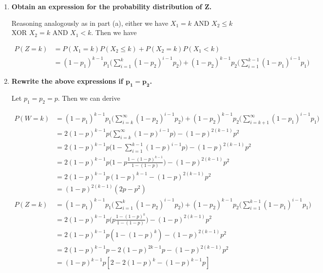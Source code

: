 \documentclass[10pt, oneside]{article}
\begin{document}
\begin{enumerate}[label=8.\arabic*]
\begin{enumerate}
	\item  \begin{tcolorbox}[
	  colback=Cerulean!5!white,
	  colframe=Cerulean!75!black]
	\textbf{Obtain an expression for the probability distribution of $\bm{Z}$.}
	\end{tcolorbox}
	
	Reasoning analogously as in part (a), either we have $X_1 = k$ AND $X_2 \leq k$ XOR $X_2 = k$ AND $X_1 < k$. Then we have
	
	\begin{align*}
	P(Z = k) &= P(X_1 = k) P(X_2 \leq k) + P(X_2 = k) P(X_1 < k) \\
	&= \boxed{ (1-p_1)^{k-1} p_1 \Bigg( \sum^k_{i = 1} (1-p_2)^{i-1} p_2 \Bigg) + (1-p_2)^{k-1} p_2 \Bigg( \sum^{k-1}_{i=1} (1-p_1)^{i-1} p_1 \Bigg)}
	\end{align*}
	
	\item  \begin{tcolorbox}[
	  colback=Cerulean!5!white,
	  colframe=Cerulean!75!black]
	\textbf{Rewrite the above expressions if $\bm{p_1 = p_2}$.}
	\end{tcolorbox}
	
	Let $p_1 = p_2 = p$. Then we can derive
	
	\begin{align*}
	P(W = k) &= (1-p_1)^{k-1} p_1 \Bigg( \sum^{\infty}_{i=k} (1-p_2)^{i-1} p_2 \Bigg) + (1-p_2)^{k-1} p_2 \Bigg( \sum^{\infty}_{i = k+1} (1-p_1)^{i-1} p_1 \Bigg) \\
	&= 2(1-p)^{k-1} p \Bigg( \sum^{\infty}_{i=k} (1-p)^{i-1} p \Bigg) - (1-p)^{2(k-1)} p^2 \\
	&= 2(1-p)^{k-1} p \Bigg( 1 - \sum^{k-1}_{i=1} (1-p)^{i-1} p \Bigg) - (1-p) ^{2(k-1)} p^2 \\
	&= 2(1-p)^{k-1} p \Bigg( 1 - p \frac{1 - (1-p)^{k-1}}{1 - (1-p)} \Bigg) - (1-p)^{2(k-1)} p^2 \\
	&= 2(1-p)^{k-1} p (1-p)^{k-1} - (1-p)^{2(k-1)} p^2 \\
	&= \boxed{(1-p)^{2(k-1)} (2p-p^2)} \\
	P(Z = k) &= (1-p_1)^{k-1} p_1 \Bigg( \sum^k_{i = 1} (1-p_2)^{i-1} p_2 \Bigg) + (1-p_2)^{k-1} p_2 \Bigg( \sum^{k-1}_{i=1} (1-p_1)^{i-1} p_1 \Bigg) \\
	&= 2(1-p)^{k-1} p \Bigg( p \frac{1 - (1-p)^k}{1 - (1-p)} \Bigg) - (1-p)^{2(k-1)} p^2 \\
	&= 2(1-p)^{k-1} p (1 - (1-p)^k) - (1-p)^{2(k-1)} p^2 \\
	&= 2(1-p)^{k-1} p - 2(1-p)^{2k-1} p - (1-p)^{2(k-1)} p^2 \\
	&= \boxed{ (1-p)^{k-1} p [2 - 2(1-p)^k - (1-p)^{k-1} p] }
	\end{align*}
	

\end{enumerate}
\end{enumerate}
\end{document}
